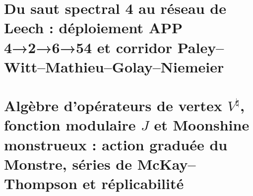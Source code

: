 

\chapter{Du saut spectral 4 au réseau de Leech : déploiement APP 4→2→6→54 et corridor Paley–Witt–Mathieu–Golay–Niemeier}
\label{chap:sucesor-102-21}

\begin{HMTScientificOwnerSubordinated}


\end{HMTScientificOwnerSubordinated}


















\chapter{Algèbre d'opérateurs de vertex \texorpdfstring{\(V^\natural\)}{V^♮}, fonction modulaire \texorpdfstring{\(J\)}{J} et Moonshine monstrueux : action graduée du Monstre, séries de McKay–Thompson et réplicabilité}
\label{chap:sucesor-102-22}
\label{chap:voa-moonshine-rector}






